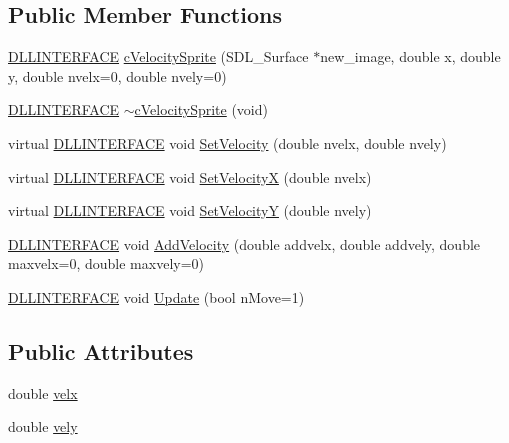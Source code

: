 \subsection*{Public Member Functions}
\begin{DoxyCompactItemize}
\item 
\hyperlink{_s_d_l__ep_8h_a38dd54df4631b4daf553096353d7b20b}{D\-L\-L\-I\-N\-T\-E\-R\-F\-A\-C\-E} \hyperlink{classc_velocity_sprite_a1901bf8ea344c51f40b788cae28dbcdd}{c\-Velocity\-Sprite} (S\-D\-L\-\_\-\-Surface $\ast$new\-\_\-image, double x, double y, double nvelx=0, double nvely=0)
\item 
\hyperlink{_s_d_l__ep_8h_a38dd54df4631b4daf553096353d7b20b}{D\-L\-L\-I\-N\-T\-E\-R\-F\-A\-C\-E} \hyperlink{classc_velocity_sprite_a67232bb630466595a26d4ce84bb32f0b}{$\sim$c\-Velocity\-Sprite} (void)
\item 
virtual \hyperlink{_s_d_l__ep_8h_a38dd54df4631b4daf553096353d7b20b}{D\-L\-L\-I\-N\-T\-E\-R\-F\-A\-C\-E} void \hyperlink{classc_velocity_sprite_acb4d562f26588d03e800a3aa9e597dff}{Set\-Velocity} (double nvelx, double nvely)
\item 
virtual \hyperlink{_s_d_l__ep_8h_a38dd54df4631b4daf553096353d7b20b}{D\-L\-L\-I\-N\-T\-E\-R\-F\-A\-C\-E} void \hyperlink{classc_velocity_sprite_a2a3c2332715a4a2ee59c5e8370be3697}{Set\-Velocity\-X} (double nvelx)
\item 
virtual \hyperlink{_s_d_l__ep_8h_a38dd54df4631b4daf553096353d7b20b}{D\-L\-L\-I\-N\-T\-E\-R\-F\-A\-C\-E} void \hyperlink{classc_velocity_sprite_aef3df19c5adebcf2be2523cd9a73d292}{Set\-Velocity\-Y} (double nvely)
\item 
\hyperlink{_s_d_l__ep_8h_a38dd54df4631b4daf553096353d7b20b}{D\-L\-L\-I\-N\-T\-E\-R\-F\-A\-C\-E} void \hyperlink{classc_velocity_sprite_ac35a2d125dd91d232da192c40e3ae13a}{Add\-Velocity} (double addvelx, double addvely, double maxvelx=0, double maxvely=0)
\item 
\hyperlink{_s_d_l__ep_8h_a38dd54df4631b4daf553096353d7b20b}{D\-L\-L\-I\-N\-T\-E\-R\-F\-A\-C\-E} void \hyperlink{classc_velocity_sprite_abe53c4d2cacfe4252a0aea6f8ec041af}{Update} (bool n\-Move=1)
\end{DoxyCompactItemize}
\subsection*{Public Attributes}
\begin{DoxyCompactItemize}
\item 
double \hyperlink{classc_velocity_sprite_a41129f39de35a54c3d35481e615fc137}{velx}
\item 
double \hyperlink{classc_velocity_sprite_a38b6e47912f9b5a385e90e5192850936}{vely}
\end{DoxyCompactItemize}


